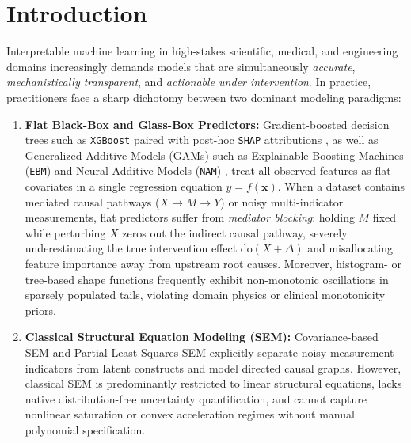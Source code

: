 \section{Introduction}
\label{sec:intro}

Interpretable machine learning in high-stakes scientific, medical, and engineering domains increasingly demands models that are simultaneously \emph{accurate}, \emph{mechanistically transparent}, and \emph{actionable under intervention}. In practice, practitioners face a sharp dichotomy between two dominant modeling paradigms:

\begin{enumerate}
  \item \textbf{Flat Black-Box and Glass-Box Predictors:} Gradient-boosted decision trees such as \texttt{XGBoost} \citep{chen2016xgboost} paired with post-hoc \texttt{SHAP} attributions \citep{lundberg2017unified}, as well as Generalized Additive Models (GAMs) such as Explainable Boosting Machines (\texttt{EBM}) \citep{lou2013accurate} and Neural Additive Models (\texttt{NAM}) \citep{agarwal2021neural}, treat all observed features as flat covariates in a single regression equation $y = f(\mathbf{x})$. When a dataset contains mediated causal pathways ($X \to M \to Y$) or noisy multi-indicator measurements, flat predictors suffer from \emph{mediator blocking}: holding $M$ fixed while perturbing $X$ zeros out the indirect causal pathway, severely underestimating the true intervention effect $\mathrm{do}(X + \Delta)$ and misallocating feature importance away from upstream root causes. Moreover, histogram- or tree-based shape functions frequently exhibit non-monotonic oscillations in sparsely populated tails, violating domain physics or clinical monotonicity priors.
  \item \textbf{Classical Structural Equation Modeling (SEM):} Covariance-based SEM \citep{bollen1989structural,rosseel2012lavaan} and Partial Least Squares SEM \citep{wold1982soft,dijkstra2015consistent} explicitly separate noisy measurement indicators from latent constructs and model directed causal graphs. However, classical SEM is predominantly restricted to linear structural equations, lacks native distribution-free uncertainty quantification, and cannot capture nonlinear saturation or convex acceleration regimes without manual polynomial specification.
\end{enumerate}

